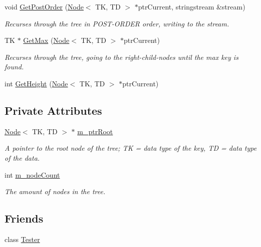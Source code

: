\begin{DoxyCompactItemize}
void \hyperlink{classBinarySearchTree_ab6c97fbe7406de99a7c6d90247eb47c3}{Get\+Post\+Order} (\hyperlink{classNode}{Node}$<$ TK, TD $>$ $\ast$ptr\+Current, stringstream \&stream)
\begin{DoxyCompactList}\small\item\em Recurses through the tree in P\+O\+S\+T-\/\+O\+R\+D\+ER order, writing to the stream. \end{DoxyCompactList}\item 
TK $\ast$ \hyperlink{classBinarySearchTree_a2792ab45f6037873d8d73b2bcfa40d8f}{Get\+Max} (\hyperlink{classNode}{Node}$<$ TK, TD $>$ $\ast$ptr\+Current)
\begin{DoxyCompactList}\small\item\em Recurses through the tree, going to the right-\/child-\/nodes until the max key is found. \end{DoxyCompactList}\item 
int \hyperlink{classBinarySearchTree_a0e871429a131d331b831334d57888211}{Get\+Height} (\hyperlink{classNode}{Node}$<$ TK, TD $>$ $\ast$ptr\+Current)
\end{DoxyCompactItemize}
\subsection*{Private Attributes}
\begin{DoxyCompactItemize}
\item 
\hyperlink{classNode}{Node}$<$ TK, TD $>$ $\ast$ \hyperlink{classBinarySearchTree_a721f28bd510e040b8573bdb1a19744ba}{m\+\_\+ptr\+Root}
\begin{DoxyCompactList}\small\item\em A pointer to the root node of the tree; TK = data type of the key, TD = data type of the data. \end{DoxyCompactList}\item 
int \hyperlink{classBinarySearchTree_a619940c056dcb8aa8246ada1e7ca2e2c}{m\+\_\+node\+Count}
\begin{DoxyCompactList}\small\item\em The amount of nodes in the tree. \end{DoxyCompactList}\end{DoxyCompactItemize}
\subsection*{Friends}
\begin{DoxyCompactItemize}
\item 
class \hyperlink{classBinarySearchTree_a8da748c2b0afd5c6b23e931591f217de}{Tester}
\end{DoxyCompactItemize}


